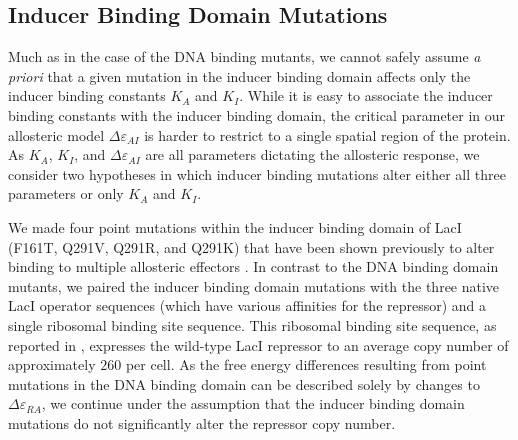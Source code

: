 \subsection{Inducer Binding Domain Mutations}
Much as in the case of the DNA binding mutants, we cannot safely assume
\textit{a priori} that
a given mutation in the inducer binding domain affects only the inducer
binding constants $K_A$ and $K_I$. While it is easy to associate the inducer
binding constants with the inducer binding domain, the critical parameter in
our allosteric model $\Delta\varepsilon_{AI}$ is harder to restrict to a
single spatial region of the protein. As $K_A$, $K_I$, and
$\Delta\varepsilon_{AI}$ are all parameters dictating the allosteric
response, we consider two hypotheses in which inducer binding mutations alter
either all three parameters or only $K_A$ and $K_I$.

We made four point mutations within the inducer binding domain of LacI (F161T, Q291V,
Q291R, and Q291K) that have been shown previously to alter binding to
multiple allosteric effectors \cite{Daber2011a}. In contrast to the DNA binding
domain mutants, we paired the inducer binding domain mutations with the three
native LacI operator sequences (which have various affinities for the repressor)
and a single ribosomal binding site sequence. This ribosomal binding site sequence, as reported in 
\cite{Garcia2011}, expresses the wild-type LacI repressor
to an average copy number of approximately $260$ per cell. As the free energy
differences resulting from point mutations in the DNA binding domain can be
described solely by changes to $\Delta\varepsilon_{RA}$, we continue under
the assumption that the inducer binding domain mutations do not significantly alter the repressor
copy number. 

